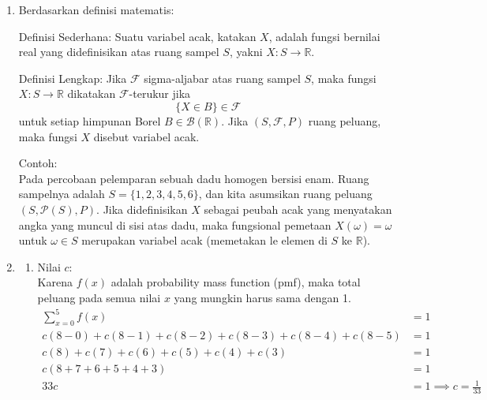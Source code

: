 \documentclass[12pt,a4paper]{article}
\begin{document}
\begin{enumerate}
  \item Berdasarkan definisi matematis:

        Definisi Sederhana:
        Suatu variabel acak, katakan $X$, adalah fungsi bernilai real yang didefinisikan atas ruang sampel $S$, yakni $X : S \to \mathbb{R}$.

        Definisi Lengkap:
        Jika $\mathcal{F}$ sigma-aljabar atas ruang sampel $S$, maka fungsi $X : S \to \mathbb{R}$ dikatakan $\mathcal{F}$-terukur jika
        \[\{X \in B\} \in \mathcal{F}\]
        untuk setiap himpunan Borel $B \in \mathcal{B}(\mathbb{R})$. Jika $(S, \mathcal{F}, P)$ ruang peluang, maka fungsi $X$ disebut variabel acak.

        Contoh: \\
        Pada percobaan pelemparan sebuah dadu homogen bersisi enam. Ruang sampelnya adalah $S = \{1, 2, 3, 4, 5, 6\}$, dan kita asumsikan ruang peluang $(S, \mathcal{P}(S), P)$. Jika didefinisikan $X$ sebagai peubah acak yang menyatakan angka yang muncul di sisi atas dadu, maka fungsional pemetaan $X(\omega) = \omega$ untuk $\omega \in S$ merupakan variabel acak (memetakan le elemen di $S$ ke $\mathbb{R}$).

  \item \begin{enumerate}
          \item Nilai $c$: \\
                Karena $f(x)$ adalah probability mass function (pmf), maka total peluang pada semua nilai $x$ yang mungkin harus sama dengan 1.
                \begin{align*}
                  \sum_{x=0}^{5} f(x)                                 & = 1                           \\
                  c(8-0) + c(8-1) + c(8-2) + c(8-3) + c(8-4) + c(8-5) & = 1                           \\
                  c(8) + c(7) + c(6) + c(5) + c(4) + c(3)             & = 1                           \\
                  c(8+7+6+5+4+3)                                      & = 1                           \\
                  33c                                                 & = 1 \implies c = \frac{1}{33}
                \end{align*}


\end{enumerate}
\end{enumerate}
\end{document}
